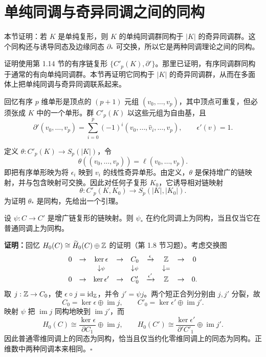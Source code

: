 \section{单纯同调与奇异同调之间的同构}
本节证明：若 $K$ 是单纯复形，则 $K$ 的单纯同调群同构于 $|K|$ 的奇异同调群。这个同构还与诱导同态及边缘同态 $\partial_*$ 可交换，所以它是两种同调理论之间的同构。

证明使用第 1.14 节的有序链复形 $\{C'_p(K),\partial'\}$。那里已证明，有序同调群同构于通常的有向单纯同调群。本节再证明它同构于 $|K|$ 的奇异同调群，从而在多面体上把单纯同调与奇异同调联系起来。

回忆有序 $p$ 维单形是顶点的 $(p+1)$ 元组 $(v_0,\ldots,v_p)$，其中顶点可重复，但必须张成 $K$ 中的一个单形。群 $C'_p(K)$ 以这些元组为自由基，且
\[
\partial'(v_0,\ldots,v_p)=\sum_{i=0}^p(-1)^i(v_0,\ldots,\widehat v_i,\ldots,v_p),\qquad \epsilon'(v)=1.
\]

定义 $\theta:C'_p(K)\to S_p(|K|)$，令
\[
\theta((v_0,\ldots,v_p))=\ell(v_0,\ldots,v_p).
\]
即把有序单形映为将 $\epsilon_i$ 映到 $v_i$ 的线性奇异单形。由定义，$\theta$ 是保持增广的链映射，并与包含映射可交换。因此对任何子复形 $K_0$，它诱导相对链映射
\[
\theta:C'_p(K,K_0)\to S_p(|K|,|K_0|).
\]
为证明 $\theta_*$ 是同构，先给出一个引理。

设 $\psi:C\to C'$ 是增广链复形的链映射。则 $\psi_*$ 在约化同调上为同构，当且仅当它在普通同调上为同构。

\textbf{证明：}回忆 $H_0(C)\cong\widetilde H_0(C)\oplus\mathbb{Z}$ 的证明（第 1.8 节习题）。考虑交换图
\[
\begin{array}{ccccccccc}
0&\to&\ker\epsilon&\to&C_0&\xrightarrow{\epsilon}&\mathbb{Z}&\to&0\\
&&\downarrow\scriptstyle\psi&&\downarrow\scriptstyle\psi&&\downarrow\scriptstyle=&&\\
0&\to&\ker\epsilon'&\to&C'_0&\xrightarrow{\epsilon'}&\mathbb{Z}&\to&0.
\end{array}
\]
取 $j:\mathbb{Z}\to C_0$，使 $\epsilon\circ j=\operatorname{id}_{\mathbb{Z}}$，并令 $j'=\psi j$。两个短正合列分别由 $j,j'$ 分裂，故
\[
C_0=\ker\epsilon\oplus\operatorname{im}j,\qquad C'_0=\ker\epsilon'\oplus\operatorname{im}j'.
\]
映射 $\psi$ 把 $\operatorname{im}j$ 同构地映到 $\operatorname{im}j'$，而
\[
H_0(C)\cong\frac{\ker\epsilon}{\partial C_1}\oplus\operatorname{im}j,\qquad
H_0(C')\cong\frac{\ker\epsilon'}{\partial'C'_1}\oplus\operatorname{im}j'.
\]
因此普通零维同调上的同态为同构，恰当且仅当约化零维同调上的同态为同构。正维数中两种同调本来相同。\hfill$\square$

